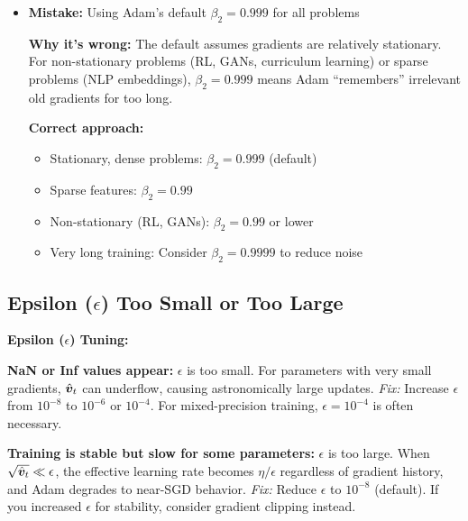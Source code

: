 \documentclass[../../main.tex]{subfiles}
\begin{document}
\begin{commonmistakes}
\begin{itemize}
    \item \textbf{Mistake:} Using Adam's default $\beta_2 = 0.999$ for all problems

    \textbf{Why it's wrong:} The default assumes gradients are relatively stationary. For non-stationary problems (RL, GANs, curriculum learning) or sparse problems (NLP embeddings), $\beta_2 = 0.999$ means Adam ``remembers'' irrelevant old gradients for too long.

    \textbf{Correct approach:}
    \begin{itemize}
        \item Stationary, dense problems: $\beta_2 = 0.999$ (default)
        \item Sparse features: $\beta_2 = 0.99$
        \item Non-stationary (RL, GANs): $\beta_2 = 0.99$ or lower
        \item Very long training: Consider $\beta_2 = 0.9999$ to reduce noise
    \end{itemize}
\end{itemize}
\end{commonmistakes}

\subsection{Epsilon ($\epsilon$) Too Small or Too Large}

\begin{important}
\textbf{Epsilon ($\epsilon$) Tuning:}

\textbf{NaN or Inf values appear:} $\epsilon$ is too small. For parameters with very small gradients, $\hat{\boldsymbol{v}}_t$ can underflow, causing astronomically large updates. \emph{Fix:} Increase $\epsilon$ from $10^{-8}$ to $10^{-6}$ or $10^{-4}$. For mixed-precision training, $\epsilon = 10^{-4}$ is often necessary.

\textbf{Training is stable but slow for some parameters:} $\epsilon$ is too large. When $\sqrt{\hat{\boldsymbol{v}}_t} \ll \epsilon$, the effective learning rate becomes $\eta / \epsilon$ regardless of gradient history, and Adam degrades to near-SGD behavior. \emph{Fix:} Reduce $\epsilon$ to $10^{-8}$ (default). If you increased $\epsilon$ for stability, consider gradient clipping instead.
\end{important}
\end{document}
